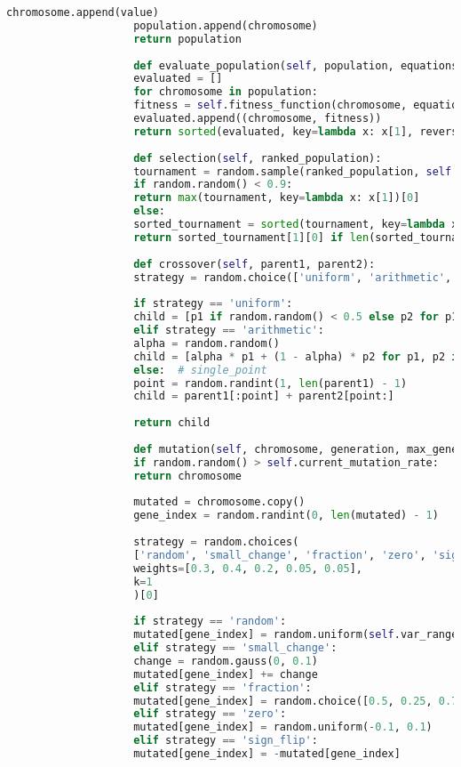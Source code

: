 \documentclass[12pt,a4paper]{article}
\newenvironment{ltrcode}{\lr\bgroup}{\egroup}
\begin{document}
\begin{ltrcode}
\begin{lstlisting}[language=Python, caption=کلاس کامل EnhancedGeneticEquationSolver]
					chromosome.append(value)
					population.append(chromosome)
					return population
					
					def evaluate_population(self, population, equations):
					evaluated = []
					for chromosome in population:
					fitness = self.fitness_function(chromosome, equations)
					evaluated.append((chromosome, fitness))
					return sorted(evaluated, key=lambda x: x[1], reverse=True)
					
					def selection(self, ranked_population):
					tournament = random.sample(ranked_population, self.tournament_size)
					if random.random() < 0.9:
					return max(tournament, key=lambda x: x[1])[0]
					else:
					sorted_tournament = sorted(tournament, key=lambda x: x[1], reverse=True)
					return sorted_tournament[1][0] if len(sorted_tournament) > 1 else sorted_tournament[0][0]
					
					def crossover(self, parent1, parent2):
					strategy = random.choice(['uniform', 'arithmetic', 'single_point'])
					
					if strategy == 'uniform':
					child = [p1 if random.random() < 0.5 else p2 for p1, p2 in zip(parent1, parent2)]
					elif strategy == 'arithmetic':
					alpha = random.random()
					child = [alpha * p1 + (1 - alpha) * p2 for p1, p2 in zip(parent1, parent2)]
					else:  # single_point
					point = random.randint(1, len(parent1) - 1)
					child = parent1[:point] + parent2[point:]
					
					return child
					
					def mutation(self, chromosome, generation, max_generations):
					if random.random() > self.current_mutation_rate:
					return chromosome
					
					mutated = chromosome.copy()
					gene_index = random.randint(0, len(mutated) - 1)
					
					strategy = random.choices(
					['random', 'small_change', 'fraction', 'zero', 'sign_flip'],
					weights=[0.3, 0.4, 0.2, 0.05, 0.05],
					k=1
					)[0]
					
					if strategy == 'random':
					mutated[gene_index] = random.uniform(self.var_range[0], self.var_range[1])
					elif strategy == 'small_change':
					change = random.gauss(0, 0.1)
					mutated[gene_index] += change
					elif strategy == 'fraction':
					mutated[gene_index] = random.choice([0.5, 0.25, 0.75, 1.0, 2.0, -0.5, -1.0])
					elif strategy == 'zero':
					mutated[gene_index] = random.uniform(-0.1, 0.1)
					elif strategy == 'sign_flip':
					mutated[gene_index] = -mutated[gene_index]
					

\end{lstlisting}
\end{ltrcode}
\end{document}

